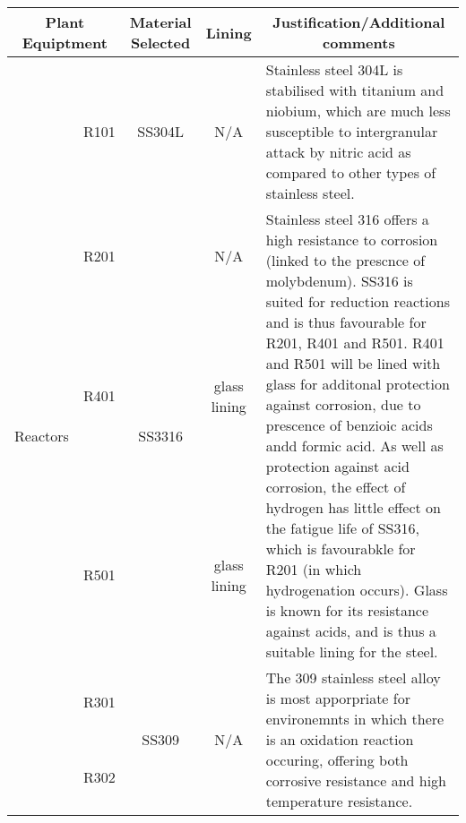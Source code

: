 

\begin{table}[H]
\begin{tabular}{@{}lcccl@{}}
\toprule
\multicolumn{2}{c}{\textbf{Plant Equiptment}}                                                                    & \textbf{Material   Selected}                                                                  & \textbf{Lining}                                    & \multicolumn{1}{c}{\textbf{Justification/Additional   comments}}              \\ \midrule
 \multirow{6}{*}{Reactors}    & R101                                                     & SS304L                                                                                        & N/A                                                & Stainless   steel 304L is stabilised with titanium and niobium, which are much less   susceptible to intergranular attack by nitric acid as compared to other types   of stainless steel.\\
     & R201     &   \multirow{3}{*}{SS3316}      & N/A      &  \multirow{3}{*}{Stainless   steel 316 offers a high resistance to corrosion (linked to the prescnce of   molybdenum). SS316 is suited for reduction reactions and is thus favourable   for R201, R401 and R501. R401 and R501 will be lined with glass for additonal   protection against corrosion, due to prescence of benzioic acids andd formic   acid. As well as protection against acid corrosion, the effect of hydrogen   has little effect on the fatigue life of SS316, which is favourabkle for R201   (in which hydrogenation occurs). Glass is known for its resistance against   acids, and is thus a suitable lining for the steel.}                                  \\
        & R401       &          & glass lining       &   \\
   & R501                                                     &          & glass lining                                       &  \\
    & R301        &        \multirow{2}{*}{SS309}          &  \multirow{2}{*}{N/A}     &      \multirow{2}{*}{The   309 stainless steel alloy is most apporpriate for environemnts in which there   is an oxidation reaction occuring, offering both corrosive resistance and   high temperature resistance.}                    \\
          & R302  &                                                                       &                             &  \\ \midrule

\end{tabular}
\end{table}
